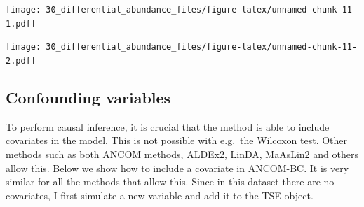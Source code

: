 \documentclass[
]{book}
\newenvironment{Shaded}{\begin{snugshade}}{\end{snugshade}}
\newcommand{\CommentTok}[1]{\textcolor[rgb]{0.56,0.35,0.01}{\textit{#1}}}
\newcommand{\DecValTok}[1]{\textcolor[rgb]{0.00,0.00,0.81}{#1}}
\newcommand{\FunctionTok}[1]{\textcolor[rgb]{0.00,0.00,0.00}{#1}}
\newcommand{\NormalTok}[1]{#1}
\newcommand{\OtherTok}[1]{\textcolor[rgb]{0.56,0.35,0.01}{#1}}
\newcommand{\SpecialCharTok}[1]{\textcolor[rgb]{0.00,0.00,0.00}{#1}}
\begin{document}
\texttt{[image: 30\_differential\_abundance\_files/figure-latex/unnamed-chunk-11-1.pdf]}

\begin{Shaded}
\end{Shaded}

\texttt{[image: 30\_differential\_abundance\_files/figure-latex/unnamed-chunk-11-2.pdf]}

\hypertarget{confounding-variables}{%
\subsection{Confounding variables}\label{confounding-variables}}

To perform causal inference, it is crucial that the method is able to include
covariates in the model. This is not possible with e.g.~the Wilcoxon test.
Other methods such as both ANCOM methods, ALDEx2, LinDA, MaAsLin2 and others
allow this. Below we show how to include a covariate in ANCOM-BC.
It is very similar for all the methods that allow this. Since in this dataset
there are no covariates, I first simulate a new variable and add it to the TSE
object.
\end{document}
